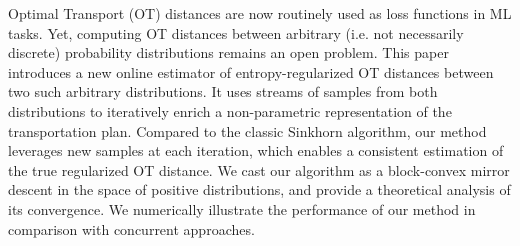 Optimal Transport (OT) distances are now routinely used as loss functions in ML tasks. Yet, computing OT distances between arbitrary (i.e. not necessarily discrete) probability distributions remains an open problem. This paper introduces a new online estimator of entropy-regularized OT distances between two such arbitrary distributions. It uses streams of samples from both distributions to iteratively enrich a non-parametric representation of the transportation plan. Compared to the classic Sinkhorn algorithm, our method leverages new samples at each iteration, which enables a consistent estimation of the true regularized OT distance. We cast our algorithm as a block-convex mirror descent in the space of positive distributions, and provide a theoretical analysis of its convergence. We numerically illustrate the performance of our method in comparison with concurrent approaches.